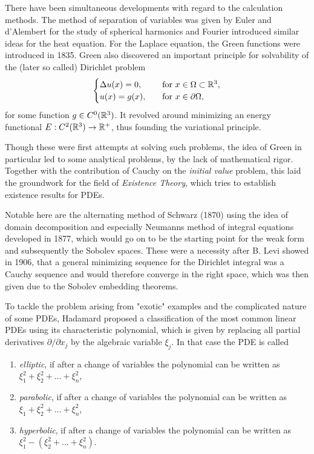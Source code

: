 There have been simultaneous developments with regard to the
calculation methods. The method of separation of variables was given by Euler and d'Alembert for the study of spherical
harmonics and Fourier introduced similar ideas for the heat equation. For the Laplace equation, the Green functions
were introduced in 1835. Green also discovered an important principle for solvability of the (later so called) 
Dirichlet problem
\begin{equation*}\begin{cases}
    \Delta u(x) = 0, \quad &\text{for } x \in \Omega \subset \mathbb{R}^3, \\
    u(x) = g(x), \quad &\text{for } x \in \partial \Omega, \\
\end{cases}
\end{equation*}
for some function $g \in C^0(\mathbb{R}^3)$. It revolved around minimizing an energy functional $E: C^2(\mathbb{R}^3) \to \mathbb{R}^+$, thus
founding the variational principle.

Though these were first attempts at solving such problems, the idea of Green in particular led to some analytical
problems, by the lack of mathematical rigor. Together with the contribution of Cauchy on the \emph{initial value} problem, this
laid the groundwork for the field of \emph{Existence Theory}, which tries to establish existence results for PDEs.

Notable here are the alternating method of Schwarz (1870) using the idea of domain decomposition and especially
Neumanns method of integral equations developed in 1877, which would go on to be the starting point for the weak
form and subsequently the Sobolev spaces. These were a necessity after B. Levi showed in 1906, that 
a general minimizing sequence for the Dirichlet integral was a Cauchy sequence and would therefore converge in 
the right space, which was then given due to the Sobolev embedding theorems.

To tackle the problem arising from "exotic" examples and the complicated nature of some PDEs, Hadamard proposed
a classification of the most common linear PDEs using its characteristic polynomial, 
which is given by replacing all partial derivatives
$\partial / \partial x_j$ by the algebraic variable $\xi_j$. In that case the PDE is called
\begin{enumerate}
    \item \emph{elliptic}, if after a change of variables the polynomial can be written as $\xi_1^2 + \xi_2^2 + \dots + \xi_n^2$,
    \item \emph{parabolic}, if after a change of variables the polynomial can be written as $\xi_1 + \xi_2^2 + \dots + \xi_n^2$,
    \item \emph{hyperbolic}, if after a change of variables the polynomial can be written as $\xi_1^2 -(\xi_2^2 + \dots + \xi_n^2)$.
\end{enumerate}


